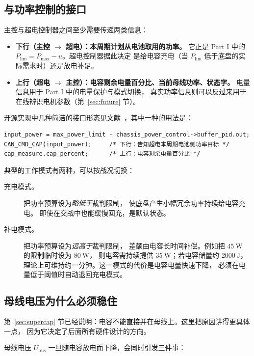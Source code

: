 \documentclass[cn,blue,11pt,device=normal]{elegantnote}
\newcommand{\Plim}{P_{\mathrm{lim}}{}}
\newcommand{\Pmax}{P_{\max}{}}
\begin{document}
\subsection{与功率控制的接口}

主控与超电控制器之间至少需要传递两类信息：

\begin{itemize}
  \item \textbf{下行（主控 $\to$ 超电）：本周期计划从电池取用的功率。}
  它正是 Part I 中的 $\Plim = \Pmax - u$。超电控制器据此决定
  是给电容充电（当 $\Plim$ 低于底盘的实际需求时）还是放电补足。
  \item \textbf{上行（超电 $\to$ 主控）：电容剩余电量百分比、当前母线功率、状态字。}
  电量信息用于 Part I 中的电量保护与模式切换，
  真实功率信息则可以反过来用于在线辨识电机参数（第~\ref{sec:future} 节）。
\end{itemize}

开源实现中几种简洁的接口形态见文献~\cite{hitszsupercap,pspsupercap,h7framework}，其中一种的用法是：
\begin{lstlisting}[style=cstyle, numbers=none]
input_power = max_power_limit - chassis_power_control->buffer_pid.out;
CAN_CMD_CAP(input_power);     /* 下行：告知超电本周期电池侧功率目标 */
cap_measure.cap_percent;      /* 上行：电容剩余电量百分比 */
\end{lstlisting}

典型的工作模式有两种，可以按战况切换：
\begin{description}
  \item[充电模式。] 把功率预算设为\emph{略低于}裁判限制，
  使底盘产生小幅冗余功率持续给电容充电。
  即使在交战中也能缓慢回充，是默认状态。
  \item[补电模式。] 把功率预算设为\emph{远高于}裁判限制，
  差额由电容长时间补偿。例如把 $45\ \mathrm{W}$ 的限制临时设为 $80\ \mathrm{W}$，
  则电容需持续提供 $35\ \mathrm{W}$；若电容储量约 $2000\ \mathrm{J}$，
  理论上可维持约一分钟。这一模式的代价是电容电量快速下降，
  必须在电量低于阈值时自动退回充电模式。
\end{description}

\subsection{母线电压为什么必须稳住}

第~\ref{sec:supercap} 节已经说明：电容不能直接并在母线上。这里把原因讲得更具体一点，
因为它决定了后面所有硬件设计的方向。

母线电压 $U_{\mathrm{bus}}$ 一旦随电容放电而下降，会同时引发三件事：
\end{document}
